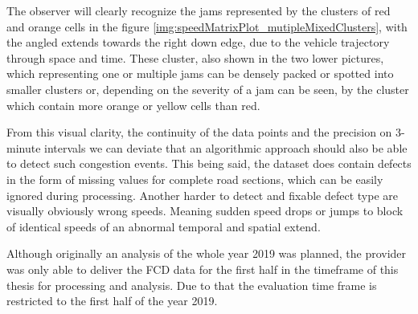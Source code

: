 \documentclass[a4paper,12pt]{report}
\begin{document}
\par The observer will clearly recognize the jams represented by the clusters of red and orange cells in the figure \ref{img:speedMatrixPlot_mutipleMixedClusters}, with the angled extends towards the right down edge, due to the vehicle trajectory through space and time. These cluster, also shown in the two lower pictures, which representing one or multiple jams can be densely packed or spotted into smaller clusters or, depending on the severity of a jam can be seen, by the cluster which contain more orange or yellow cells than red. 
\par From this visual clarity, the continuity of the data points and the precision on 3-minute intervals we can deviate that an algorithmic approach should also be able to detect such congestion events. This being said, the dataset does contain defects in the form of missing values for complete road sections, which can be easily ignored during processing. Another harder to detect and fixable defect type are visually obviously wrong speeds. Meaning sudden speed drops or jumps to block of identical speeds of an abnormal temporal and spatial extend. 
\par Although originally an analysis of the whole year 2019 was planned, the provider was only able to deliver the FCD data for the first half in the timeframe of this thesis for processing and analysis. Due to that the evaluation time frame is restricted to the first half of the year 2019.
\end{document}
